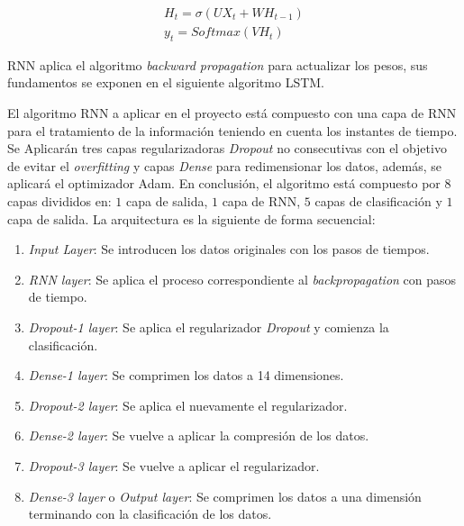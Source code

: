    \begin{align}
    	H_{t}=\sigma(UX_{t}+WH_{t-1})\\
    	y_{t}=Softmax(VH_{t})
    \end{align}

    RNN aplica el algoritmo \textit{backward propagation} para actualizar los pesos, sus fundamentos se exponen en el siguiente algoritmo LSTM.
  
    El algoritmo RNN a aplicar en el proyecto est\'{a} compuesto con una capa de RNN para el tratamiento de la informaci\'{o}n teniendo en cuenta los instantes de tiempo. Se Aplicar\'{a}n tres capas regularizadoras \textit{Dropout} no consecutivas con el objetivo de evitar el \textit{overfitting} y capas \textit{Dense} para redimensionar los datos, adem\'{a}s, se aplicar\'{a} el optimizador Adam. En conclusi\'{o}n, el algoritmo est\'{a} compuesto por $8$ capas divididos en: $1$ capa de salida, $1$ capa de RNN, $5$ capas de clasificaci\'{o}n y $1$ capa de salida. La arquitectura es la siguiente de forma secuencial:

\begin{enumerate}
	\item \textit{Input Layer}: Se introducen los datos originales con los pasos de tiempos.
	\item \textit{RNN layer}: Se aplica el proceso correspondiente al \textit{backpropagation} con pasos de tiempo.
	\item \textit{Dropout-1 layer}: Se aplica el regularizador \textit{Dropout} y comienza la clasificaci\'{o}n.
	\item \textit{Dense-1 layer}: Se comprimen los datos a 14 dimensiones.
	\item \textit{Dropout-2 layer}: Se aplica el nuevamente el regularizador.
	\item \textit{Dense-2 layer}: Se vuelve a aplicar la compresi\'{o}n de los datos.
	\item \textit{Dropout-3 layer}: Se vuelve a aplicar el regularizador.
	\item \textit{Dense-3 layer} o \textit{Output layer}: Se comprimen los datos a una dimensi\'{o}n terminando con la clasificaci\'{o}n de los datos.
\end{enumerate}

